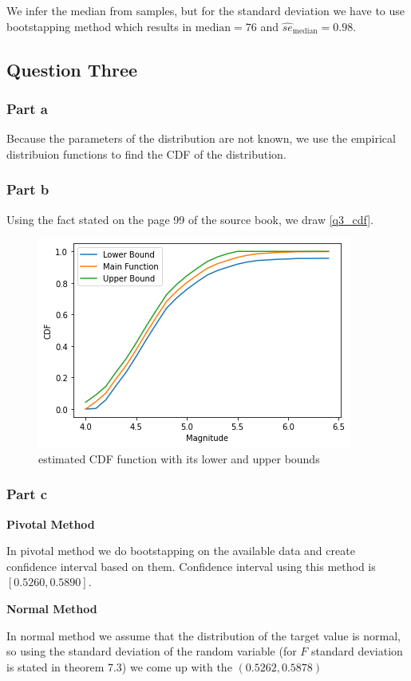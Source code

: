 \documentclass[12pt, a4paper]{book}
\begin{document}
We infer the median from samples, but for the standard deviation we have to use bootstapping method which
results in $\text{median}=76$ and $\hat{se}_{\text{median}} = 0.98$.


\subsection*{Question Three}

\subsubsection*{Part a}

Because the parameters of the distribution are not known, we use the empirical distribuion functions
to find the CDF of the distribution.

\subsubsection*{Part b}

Using the fact stated on the page 99 of the source book, we draw \autoref{q3_cdf}.

\begin{figure}[h]
    \centering
    \includegraphics[width=0.5\linewidth]{image/q3/cdf.png}
    \caption{estimated CDF function with its lower and upper bounds}
    \label{q3_cdf}
\end{figure}

\subsubsection*{Part c}

\textbf{Pivotal Method}

In pivotal method we do bootstapping on the available data and create confidence interval based on them.
Confidence interval using this method is $[0.5260, 0.5890]$.

\textbf{Normal Method}

In normal method we assume that the distribution of the target value is normal, so using the standard deviation
of the random variable (for $F$ standard deviation is stated in theorem 7.3) we come up with the
$(0.5262, 0.5878)$
\end{document}
